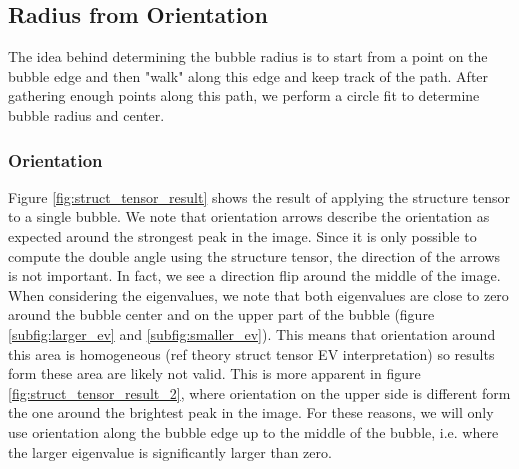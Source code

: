 		
		
	
	\subsection{Radius from Orientation}\label{radius_from_orientation}
		The idea behind determining the bubble radius is to start from a point on the bubble edge and then "walk" along this edge and keep track of the path. After gathering enough points along this path, we perform a circle fit to determine bubble radius and center. 
		
		\subsubsection{Orientation}
		
		Figure \ref{fig:struct_tensor_result} shows the result of applying the structure tensor to a single bubble. We note that orientation arrows describe the orientation as expected around the strongest peak in the image. Since it is only possible to compute the double angle using the structure tensor, the direction of the arrows is not important. In fact, we see a direction flip around the middle of the image. When considering the eigenvalues, we note that both eigenvalues are close to zero around the bubble center and on the upper part of the bubble (figure \ref{subfig:larger_ev} and \ref{subfig:smaller_ev}). This means that orientation around this area is homogeneous (ref theory struct tensor EV interpretation) so results form these area are likely not valid. This is more apparent in figure \ref{fig:struct_tensor_result_2}, where orientation on the upper side is different form the one around the brightest peak in the image. For these reasons, we will only use orientation along the bubble edge up to the middle of the bubble, i.e. where the larger eigenvalue is significantly larger than zero.
		
